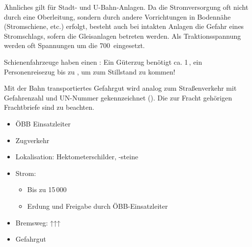 {\begin{description}
  Ähnliches gilt für Stadt- und U-Bahn-Anlagen. Da die
  Stromversorgung oft nicht durch eine Oberleitung, sondern
  durch andere Vorrichtungen in Bodennähe (Stromschiene,
  etc.) erfolgt, besteht auch bei intakten Anlagen die
  Gefahr eines Stromschlags, sofern die Gleisanlagen
  betreten werden. Als Traktionsspannung werden oft
  Spannungen um die 700\, eingesetzt.
  \cite{U61989}
  \item[Problem Bremsweg]
  Schienenfahrzeuge haben einen : Ein Güterzug benötigt ca. 1\,,
  ein Personenreisezug bis zu , um
  zum Stillstand zu kommen!
  
  \item[Problem Gefahrgut]
  Mit der Bahn transportiertes Gefahrgut wird analog zum
  Straßenverkehr mit Gefahrenzahl und UN-Nummer
  gekennzeichnet (). Die
  zur Fracht gehörigen Frachtbriefe sind zu beachten.
\end{description}
}{%
\begin{itemize}
  \item ÖBB Einsatzleiter
  \item Zugverkehr
  \item Lokalisation: Hektometerschilder, -steine
  \item Strom:
  \begin{itemize}
    \item Bis zu 15\,000\,
    \item Erdung und Freigabe durch ÖBB-Einsatzleiter
  \end{itemize}
  \item Bremsweg: ↑↑↑
  \item Gefahrgut
\end{itemize}


}{}{}{}



















